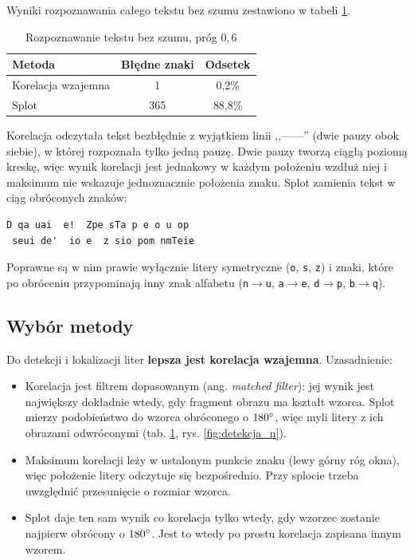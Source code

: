 \documentclass[12pt]{article}
\begin{document}
Wyniki rozpoznawania całego tekstu bez szumu zestawiono w tabeli \ref{tab:bez_szumu}.

\begin{table}[H]
    \centering
    \begin{tabular}{|l|c|c|}
        \hline
        \textbf{Metoda} & \textbf{Błędne znaki} & \textbf{Odsetek} \\
        \hline
        Korelacja wzajemna & 1   & 0,2\%  \\
        Splot              & 365 & 88,8\% \\
        \hline
    \end{tabular}
    \caption{Rozpoznawanie tekstu bez szumu, próg $0{,}6$}
    \label{tab:bez_szumu}
\end{table}

Korelacja odczytała tekst bezbłędnie z wyjątkiem linii ,,------'' (dwie pauzy obok siebie), w której rozpoznała tylko jedną pauzę. Dwie pauzy tworzą ciągłą poziomą kreskę, więc wynik korelacji jest jednakowy w każdym położeniu wzdłuż niej i maksimum nie wskazuje jednoznacznie położenia znaku. Splot zamienia tekst w ciąg obróconych znaków:
\begin{verbatim}
D qa uai  e!  Zpe sTa p e o u op
 seui de'  io e  z sio pom nmTeie
\end{verbatim}
Poprawne są w nim prawie wyłącznie litery symetryczne (\texttt{o}, \texttt{s}, \texttt{z}) i znaki, które po obróceniu przypominają inny znak alfabetu (\texttt{n}$\to$\texttt{u}, \texttt{a}$\to$\texttt{e}, \texttt{d}$\to$\texttt{p}, \texttt{b}$\to$\texttt{q}).

\subsection{Wybór metody}

Do detekcji i lokalizacji liter \textbf{lepsza jest korelacja wzajemna}. Uzasadnienie:
\begin{itemize}
    \item Korelacja jest filtrem dopasowanym (ang. \emph{matched filter}): jej wynik jest największy dokładnie wtedy, gdy fragment obrazu ma kształt wzorca. Splot mierzy podobieństwo do wzorca obróconego o $180\degree$, więc myli litery z ich obrazami odwróconymi (tab. \ref{tab:bez_szumu}, rys. \ref{fig:detekcja_n}).
    \item Maksimum korelacji leży w ustalonym punkcie znaku (lewy górny róg okna), więc położenie litery odczytuje się bezpośrednio. Przy splocie trzeba uwzględnić przesunięcie o rozmiar wzorca.
    \item Splot daje ten sam wynik co korelacja tylko wtedy, gdy wzorzec zostanie najpierw obrócony o $180\degree$. Jest to wtedy po prostu korelacja zapisana innym wzorem.
\end{itemize}
\end{document}
